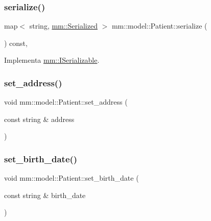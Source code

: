 \mbox{\label{classmm_1_1model_1_1_patient_ae3ac219cd109e8c53daaf9b2758c3a0e}} 
\subsubsection{\texorpdfstring{serialize()}{serialize()}}
{\footnotesize\ttfamily map$<$ string, \hyperlink{structmm_1_1_serialized}{mm\+::\+Serialized} $>$ mm\+::model\+::\+Patient\+::serialize (\begin{DoxyParamCaption}{ }\end{DoxyParamCaption}) const\hspace{0.3cm}{\ttfamily [override]}, {\ttfamily [virtual]}}



Implementa \hyperlink{classmm_1_1_i_serializable_a20a59e2324c8dbf6fefe4d11ae89d0fb}{mm\+::\+I\+Serializable}.

\mbox{\label{classmm_1_1model_1_1_patient_a4e19f86233b55b4dec59f947f1dfe32a}} 
\subsubsection{\texorpdfstring{set\+\_\+address()}{set\_address()}}
{\footnotesize\ttfamily void mm\+::model\+::\+Patient\+::set\+\_\+address (\begin{DoxyParamCaption}\item[{const string \&}]{address }\end{DoxyParamCaption})}

\mbox{\label{classmm_1_1model_1_1_patient_ad73008977024e6ca48e5c687eb27b996}} 
\subsubsection{\texorpdfstring{set\+\_\+birth\+\_\+date()}{set\_birth\_date()}}
{\footnotesize\ttfamily void mm\+::model\+::\+Patient\+::set\+\_\+birth\+\_\+date (\begin{DoxyParamCaption}\item[{const string \&}]{birth\+\_\+date }\end{DoxyParamCaption})}

